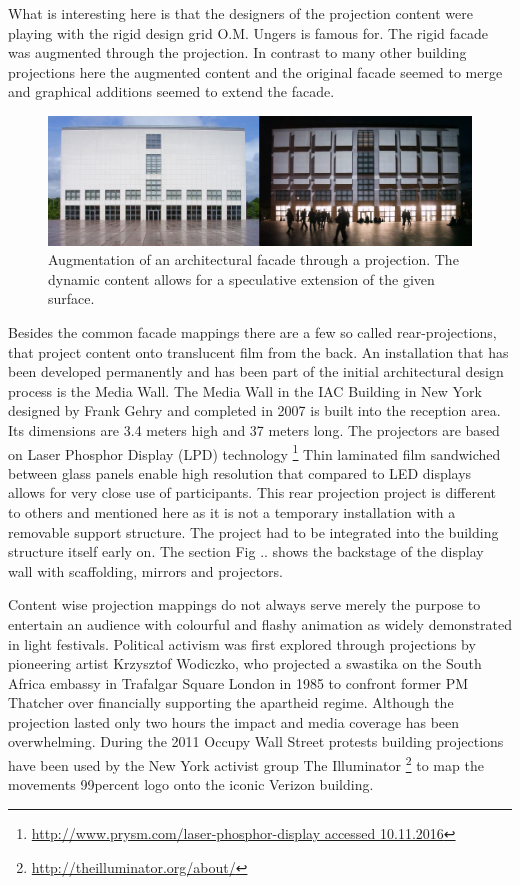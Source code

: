 
What is interesting here is that the designers of the projection content were playing with the rigid design grid O.M. Ungers is famous for. The rigid facade was augmented through the projection. In contrast to many other building projections here the augmented content and the original facade seemed to merge and graphical additions seemed to extend the facade.


\begin{figure}[htp]
\centering
\includegraphics[width=\textwidth]{Illustrations/Ungers_day_night.jpg}
\caption{Augmentation of an architectural facade through a projection. The dynamic content allows for a speculative extension of the given surface.}
\label{fig:ungers}
\end{figure}


Besides the common facade mappings there are a few so called rear-projections, that project content onto translucent film from the back. An installation that has been developed permanently and has been part of the initial architectural design process is the Media Wall.
The Media Wall in the IAC Building in New York designed by Frank Gehry and completed in 2007 is built into the reception area. 
Its dimensions are 3.4 meters high and 37 meters long. 
The projectors are based on Laser Phosphor Display (LPD) technology \footnote{ \url{http://www.prysm.com/laser-phosphor-display accessed 10.11.2016}}
Thin laminated film sandwiched between glass panels enable high resolution that compared to LED displays allows for very close use of participants.
This rear projection project is different to others and mentioned here as it is not a temporary installation with a removable support structure. The project had to be integrated into the building structure itself early on. The section Fig .. shows the backstage of the display wall with scaffolding, mirrors and projectors.

Content wise projection mappings do not always serve merely the purpose to entertain an audience with colourful and flashy animation as widely demonstrated in light festivals.   
Political activism was first explored through projections by pioneering artist Krzysztof Wodiczko, who projected a swastika on the South Africa  embassy  in Trafalgar Square London in 1985 to confront former PM Thatcher over financially supporting the  apartheid regime. Although the projection lasted only two hours the impact and media coverage has been overwhelming.     
During the 2011 Occupy Wall Street protests building projections have been used by the New York activist group The Illuminator \footnote{\url{http://theilluminator.org/about/}} to map the movements 99percent logo onto the iconic Verizon building. 

